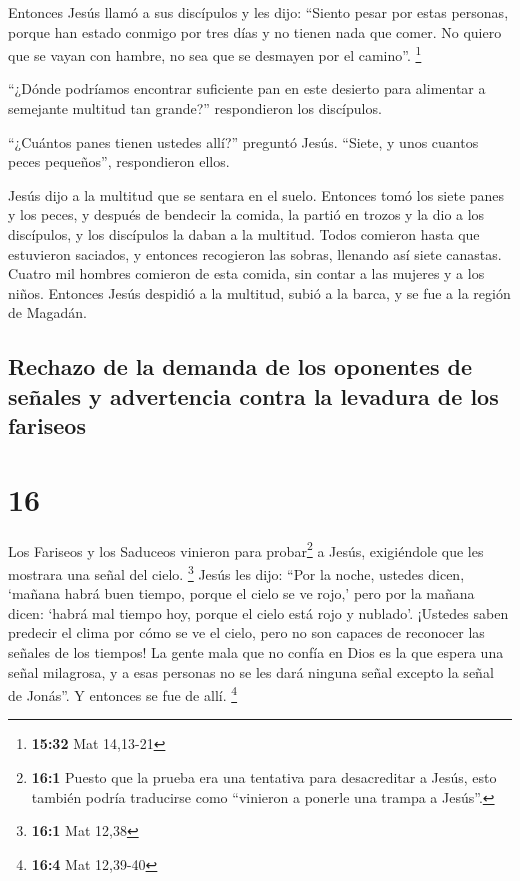  Entonces Jesús llamó a sus discípulos y les dijo:
``Siento pesar por estas personas, porque han estado conmigo por tres
días y no tienen nada que comer. No quiero que se vayan con hambre, no
sea que se desmayen por el camino''. \footnote{\textbf{15:32} Mat
  14,13-21}

 ``¿Dónde podríamos encontrar suficiente pan en este
desierto para alimentar a semejante multitud tan grande?'' respondieron
los discípulos.

 ``¿Cuántos panes tienen ustedes allí?'' preguntó Jesús.
``Siete, y unos cuantos peces pequeños'', respondieron ellos.

 Jesús dijo a la multitud que se sentara en el suelo.
 Entonces tomó los siete panes y los peces, y después de
bendecir la comida, la partió en trozos y la dio a los discípulos, y los
discípulos la daban a la multitud.  Todos comieron hasta
que estuvieron saciados, y entonces recogieron las sobras, llenando así
siete canastas.  Cuatro mil hombres comieron de esta
comida, sin contar a las mujeres y a los niños.  Entonces
Jesús despidió a la multitud, subió a la barca, y se fue a la región de
Magadán.

\hypertarget{rechazo-de-la-demanda-de-los-oponentes-de-seuxf1ales-y-advertencia-contra-la-levadura-de-los-fariseos}{%
\subsection{Rechazo de la demanda de los oponentes de señales y
advertencia contra la levadura de los
fariseos}\label{rechazo-de-la-demanda-de-los-oponentes-de-seuxf1ales-y-advertencia-contra-la-levadura-de-los-fariseos}}

\hypertarget{section-15}{%
\section{16}\label{section-15}}

 Los Fariseos y los Saduceos vinieron para
probar\footnote{\textbf{16:1} Puesto que la prueba era una tentativa
  para desacreditar a Jesús, esto también podría traducirse como
  ``vinieron a ponerle una trampa a Jesús''.} a Jesús, exigiéndole que
les mostrara una señal del cielo. \footnote{\textbf{16:1} Mat 12,38}
 Jesús les dijo: ``Por la noche, ustedes dicen, `mañana
habrá buen tiempo, porque el cielo se ve rojo,'  pero por
la mañana dicen: `habrá mal tiempo hoy, porque el cielo está rojo y
nublado'. ¡Ustedes saben predecir el clima por cómo se ve el cielo, pero
no son capaces de reconocer las señales de los tiempos! 
La gente mala que no confía en Dios es la que espera una señal
milagrosa, y a esas personas no se les dará ninguna señal excepto la
señal de Jonás''. Y entonces se fue de allí. \footnote{\textbf{16:4} Mat
  12,39-40}


